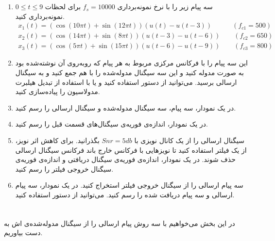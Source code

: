 \documentclass[a4paper]{article}
\begin{document}
\section{} 
\begin{enumerate}
	\item
سه پیام زیر را با نرخ نمونه‌برداری 
$ f_{s} = 10000 $
برای لحظات 
$ 0 \leq t \leq 9 $
 نمونه‌برداری کنید.
\begin{gather*}
	x_1(t) = (\cos(10 \pi t)+ \sin(12 \pi t)) (u(t)-u(t-3)) \quad \qquad (f_{c1} = 500)
	\\
	x_2(t) = (\cos(14 \pi t)+ \sin(8 \pi t)) (u(t-3)-u(t-6)) \qquad (f_{c2} = 650)
	\\
	x_3(t) = (\cos(5 \pi t)+ \sin(15 \pi t)) (u(t-6)-u(t-9)) \qquad (f_{c3} = 800)
\end{gather*}
\item
این سه پیام را با فرکانس‌ مرکزی مربوط به هر پیام که روبه‌روی آن نوشته‌شده‌ بود به صورت
مدوله کنید و این سه سیگنال مدوله‌شده را با هم جمع کنید و به سیگنال ارسالی برسید. می‌توانید از دستور
استفاده کنید و یا با استفاده از تبدیل هیلبرت مدولاسیون 
را پیاده‌سازی کنید.
\item
در یک نمودار، سه‌ پیام، سه سیگنال مدوله‌شده و سیگنال ارسالی را رسم کنید.
\item
 در یک نمودار، اندازه‌ی فوریه‌ی سیگنال‌‌های قسمت قبل را رسم کنید.
\item
سیگنال ارسالی را از یک کانال نویزی با
 $ Snr = 5db $
 بگذرانید. برای کاهش اثر نویز، از یک فیلتر  استفاده کنید تا نویز‌هایی با فرکانس خارج باند فرکانس سیگنال ارسالی حذف شوند.
 در یک نمودار، اندازه‌ی فوریه‌ی سیگنال دریافتی و اندازه‌ی فوریه‌ی سیگنال خروجی فیلتر  را رسم کنید.
\item
  سه پیام ارسالی را از سیگنال خروجی فیلتر  استخراج کنید. در یک نمودار، سه پیام ارسالی و سه پیام دریافت شده را رسم کنید. می‌توانید از دستور
  استفاده کنید.
\end{enumerate}
\section{}
در این بخش می‌خواهیم با سه روش پیام ارسالی را از سیگنال مدوله‌شده‌ی  
اش به دست بیاوریم.
 
\end{document}
